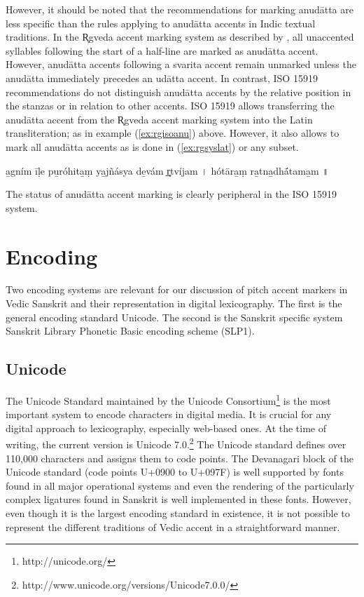 However, it should be noted that the recommendations for marking anudātta are less specific than the rules applying to anudātta accents in Indic textual traditions. In the R̥gveda accent marking system as described by \citet[p.~449]{Macdonell1916}, all unaccented syllables following the start of a half-line are marked as anudātta accent. However, anudātta accents following a svarita accent remain unmarked unless the anudātta immediately precedes an udātta accent. In contrast, ISO 15919 recommendations do not distinguish anudātta accents by the relative position in the stanzas or in relation to other accents. ISO 15919 allows transferring the anudātta accent from the R̥gveda accent marking system into the Latin transliteration; as in example (\ref{ex:rgisoanu}) above. However, it also allows to mark all anudātta accents as is done in (\ref{ex:rgsyslat}) or any subset. 

\begin{exe}
\ex\label{ex:rgsyslat} a̲gním īḷe pu̲róhita̲ṃ ya̲jñásya de̲vám r̥̲tvíjam {\devfont ।} hótāra̲ṃ ra̲tna̲dhā́tama̲m {\devfont ॥}
\end{exe}

The status of anudātta accent marking is clearly peripheral in the ISO 15919 system.

\chapter{Encoding}

Two encoding systems are relevant for our discussion of pitch accent markers in Vedic Sanskrit and their representation in digital lexicography. The first is the general encoding standard Unicode. The second is the Sanskrit specific system Sanskrit Library Phonetic Basic encoding scheme (SLP1).

\section{Unicode}

The Unicode Standard maintained by the Unicode Consortium\footnote{http://unicode.org/} is the most important system to encode characters in digital media. It is crucial for any digital approach to lexicography, especially web-based ones. At the time of writing, the current version is Unicode 7.0.\footnote{http://www.unicode.org/versions/Unicode7.0.0/} The Unicode standard defines over 110,000 characters and assigns them to code points. The Devanagari block of the Unicode standard (code points U+0900 to U+097F) is well supported by fonts found in all major operational systems and even the rendering of the particularly complex ligatures found in Sanskrit is well implemented in these fonts. However, even though it is the largest encoding standard in existence, it is not possible to represent the different traditions of Vedic accent in a straightforward manner. 


